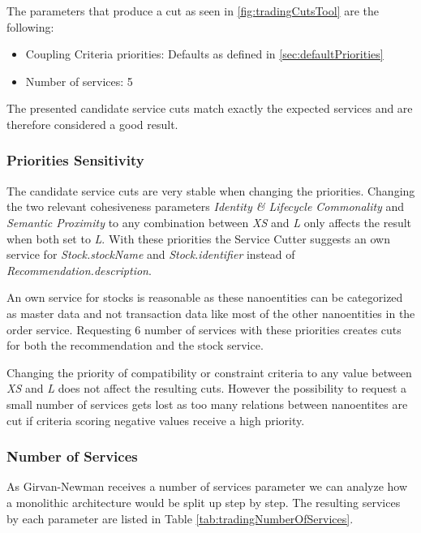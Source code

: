The parameters that produce a cut as seen in \ref{fig:tradingCutsTool} are the following:

\begin{itemize}
\item Coupling Criteria priorities: Defaults as defined in \ref{sec:defaultPriorities}
\item Number of services: 5
\end{itemize}

The presented candidate service cuts match exactly the expected services and are therefore considered a good result.

\subsubsection{Priorities Sensitivity}

The candidate service cuts are very stable when changing the priorities. Changing the two relevant cohesiveness parameters \textit{Identity \& Lifecycle Commonality} and \textit{Semantic Proximity} to any combination between \textit{XS} and \textit{L} only affects the result when both set to \textit{L}. With these priorities the Service Cutter suggests an own service for \textit{Stock.stockName} and \textit{Stock.identifier} instead of \textit{Recommendation.description}.

An own service for stocks is reasonable as these nanoentities can be categorized as master data and not transaction data like most of the other nanoentities in the order service. Requesting 6 number of services with these priorities creates cuts for both the recommendation and the stock service. 

Changing the priority of compatibility or constraint criteria to any value between \textit{XS} and \textit{L} does not affect the resulting cuts. However the possibility to request a small number of services gets lost as too many relations between nanoentites are cut if criteria scoring negative values receive a high priority. 

\subsubsection{Number of Services}

As Girvan-Newman receives a number of services parameter we can analyze how a monolithic architecture would be split up step by step. The resulting services by each parameter are listed in Table \ref{tab:tradingNumberOfServices}.

